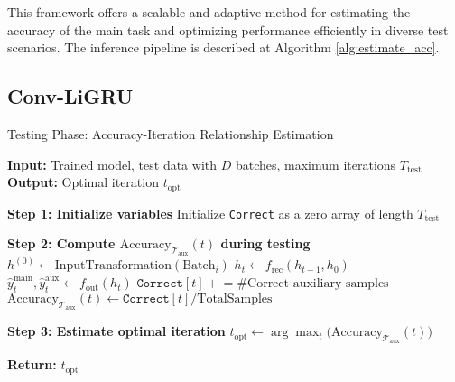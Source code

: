This framework offers a scalable and adaptive method for estimating the accuracy of the main task and optimizing performance efficiently in diverse test scenarios.
The inference pipeline is described at Algorithm \ref{alg:estimate_acc}.

\subsection{Conv-LiGRU}
\label{subsec:arch}
\begin{algorithm}[t!]
\caption{Testing Phase: Accuracy-Iteration Relationship Estimation}
\begin{algorithmic}[1]
\State \textbf{Input:} Trained model, test data with $D$ batches, maximum iterations $T_\text{test}$
\State \textbf{Output:} Optimal iteration $t_\text{opt}$ 

\Statex
\State \textbf{Step 1: Initialize variables}
\State Initialize \texttt{Correct} as a zero array of length $T_\text{test}$
\Statex

\State \textbf{Step 2: Compute $\text{Accuracy}_{\mathcal{T}_\text{aux}}(t)$ during testing}
 
    \State $h^{(0)} \gets \text{InputTransformation}(\text{Batch}_i)$
     
        \State $h_t \gets f_\text{rec}(h_{t-1}, h_0)$ 
        \State $\hat{y}_t^{\text{main}}, \hat{y}_t^{\text{aux}} \gets f_\text{out}(h_t)$ 
        \State $\texttt{Correct}[t] \mathrel{+}=  \text{\# Correct auxiliary samples}$
    \EndFor
\EndFor
\State $\text{Accuracy}_{\mathcal{T}_\text{aux}}(t) \gets \texttt{Correct}[t] / \text{TotalSamples}$
\Statex

\State \textbf{Step 3: Estimate optimal iteration}
\State $t_\text{opt} \gets \arg\max_t \big(\text{Accuracy}_{\mathcal{T}_\text{aux}}(t)\big)$

\Statex
\State \textbf{Return:} $t_\text{opt}$
\end{algorithmic}
\label{alg:estimate_acc}
\end{algorithm}

